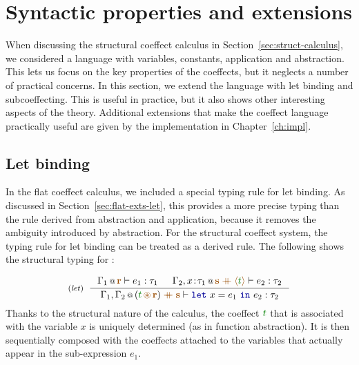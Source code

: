 %
%

\section{Syntactic properties and extensions}
\label{sec:structural-exts}

When discussing the structural coeffect calculus in Section~\ref{sec:struct-calculus}, we
considered a language with variables, constants, application and abstraction. This lets us focus
on the key properties of the coeffects, but it neglects a number of practical concerns.
In this section, we extend the language with let binding and subcoeffecting. This is useful
in practice, but it also shows other interesting aspects of the theory. Additional extensions that
make the coeffect language practically useful are given by the implementation in Chapter~\ref{ch:impl}.

\subsection{Let binding}
\label{sec:structural-exts-let}

In the flat coeffect calculus, we included a special typing rule for let binding. As discussed in
Section~\ref{sec:flat-exts-let}, this provides a more precise typing than the rule derived from
abstraction and application, because it removes the ambiguity introduced by abstraction. For the
structural coeffect system, the typing rule for let binding can be treated as a derived rule.
The following shows the structural typing for :

\begin{equation*}
\tyrule{let}
  { \coctx{\Gamma_1}{\aclrd{\textbf{r}}} \vdash e_1 : \tau_1 &
    \coctx{\Gamma_2, x\!:\!\tau_1}{\aclrd{\textbf{s}}\;\atimes\;\alift{\cclrd{t}}} \vdash e_2 : \tau_2}
  {\coctx{\Gamma_1, \Gamma_2}{(\cclrd{t} \,\aseq\, \aclrd{\textbf{r}}) \;\atimes\; \aclrd{\textbf{s}}} \vdash \kvd{let}~x=e_1~\kvd{in}~e_2 : \tau_2 }
\end{equation*}
%
Thanks to the structural nature of the calculus, the coeffect $\cclrd{t}$ that is associated with
the variable $x$ is uniquely determined (as in function abstraction). It is then sequentially
composed with the coeffects attached to the variables that actually appear in the sub-expression
$e_1$.


